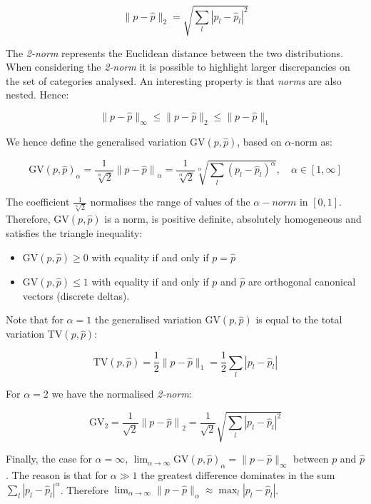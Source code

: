 $$ \| p - \hat{p} \|_2 = \sqrt{\sum_l{ {| {p_{l} - \hat{p}_{l}} |}^2 }} $$

The \emph{2-norm} represents the Euclidean distance between the two distributions. When considering the \emph{2-norm} it is possible to highlight larger discrepancies on the set of categories analysed. An interesting property is that \emph{norms} are also nested. Hence:

$$ \| p - \hat{p} \|_\infty \leqslant \| p - \hat{p} \|_2 \leqslant \| p - \hat{p} \|_1 $$

We hence define the generalised variation $\text{GV}(p, \hat{p})$, based on $\alpha$-norm as:

$$ \text{GV}(p, \hat{p})_\alpha = \frac {1} {\sqrt[\alpha]{2}}  {\| p - \hat{p} \|}_\alpha =  \frac {1} {\sqrt[\alpha]{2}} \sqrt[\alpha]{{ \sum_l{ ( p_{l} - \hat{p}_{l})^\alpha } }} ,\quad  \alpha \in [1,\infty]$$

The coefficient $\frac {1} {\sqrt[\alpha]{2}}$ normalises the range of values of the \emph{$\alpha-norm$} in $[0, 1]$. Therefore, $\text{GV}(p, \hat{p})$ is a norm, is positive definite, absolutely homogeneous and satisfies the triangle inequality:

\begin{itemize}
 \item $\text{GV}(p, \hat{p}) \geq 0 $ with equality if and only if $p = \hat{p}$
 \item $\text{GV}(p, \hat{p}) \leq 1$ with equality if and only if $p$ and $\hat{p}$ are orthogonal canonical vectors (discrete deltas).
\end{itemize}

Note that for $\alpha = 1$ the generalised variation $\text{GV}(p, \hat{p})$ is equal to the total variation $\text{TV}(p, \hat{p}) $:

$$ \text{TV}(p, \hat{p})= \frac {1} {2}  \| p - \hat{p} \|_1 =  \frac {1} {2} \sum_l{ | p_{l} - \hat{p}_{l} | } $$

For $\alpha = 2$ we have the normalised \emph{2-norm}:

$$ \text{GV}_2 = \frac {1} {\sqrt{2}}  {\| p - \hat{p} \|}_2 =  \frac {1} {\sqrt{2}} \sqrt{{ \sum_l{ | p_{l} - \hat{p}_{l}|^2 } }} $$

Finally, the case for $\alpha = \infty$, $\lim_{\alpha\to\infty} \text{GV}(p, \hat{p})_\alpha = \| p - \hat{p} \|_\infty $ between $p$ and $\hat{p}$. The reason is that for $\alpha \gg 1$ the greatest difference dominates in the sum $\sum_l{ {| p_l - \hat{p}_l |}^\alpha }$. Therefore $\lim_{\alpha\to\infty} \| p - \hat{p} \|_\alpha \approx \max_l { | p_l - \hat{p}_l | } $.

